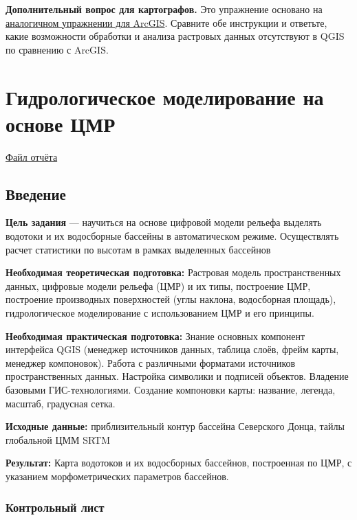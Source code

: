 \documentclass[
  12pt,
]{book}
\begin{document}
\textbf{Дополнительный вопрос для картографов.} Это упражнение основано на \href{https://tsamsonov.github.io/arcgis-course/weighted-overlay.html}{аналогичном упражнении для ArcGIS}. Сравните обе инструкции и ответьте, какие возможности обработки и анализа растровых данных отсутствуют в QGIS по сравнению с ArcGIS.

\hypertarget{hydrodem}{%
\chapter{Гидрологическое моделирование на основе ЦМР}\label{hydrodem}}

\href{https://1drv.ms/u/s!AmtmZDq3JgxHgZUDoyAAULiTkkgkCg?e=DOzWcj}{Файл отчёта}

\hypertarget{hydrodem-intro}{%
\section{Введение}\label{hydrodem-intro}}

\textbf{Цель задания} --- научиться на основе цифровой модели рельефа выделять водотоки и их водосборные бассейны в автоматическом режиме. Осуществлять расчет статистики по высотам в рамках выделенных бассейнов

\textbf{Необходимая теоретическая подготовка:} Растровая модель пространственных данных, цифровые модели рельефа (ЦМР) и их типы, построение ЦМР, построение производных поверхностей (углы наклона, водосборная площадь), гидрологическое моделирование с использованием ЦМР и его принципы.

\textbf{Необходимая практическая подготовка:} Знание основных компонент интерфейса QGIS (менеджер источников данных, таблица слоёв, фрейм карты, менеджер компоновок). Работа с различными форматами источников пространственных данных. Настройка символики и подписей объектов. Владение базовыми ГИС-технологиями. Создание компоновки карты: название, легенда, масштаб, градусная сетка.

\textbf{Исходные данные:} приблизительный контур бассейна Северского Донца, тайлы глобальной ЦММ SRTM

\textbf{Результат:} Карта водотоков и их водосборных бассейнов, построенная по ЦМР, с указанием морфометрических параметров бассейнов.

\hypertarget{hydrodem-control}{%
\subsection{Контрольный лист}\label{hydrodem-control}}
\end{document}
